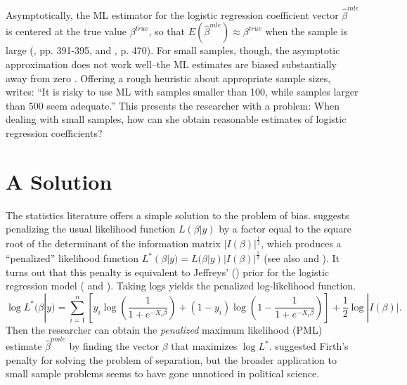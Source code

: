 \documentclass[12pt]{article}
\begin{document}
Asymptotically, the ML estimator for the logistic regression coefficient vector $\hat{\beta}^{mle}$ is centered at the true value $\beta^{true}$, so that $E(\hat{\beta}^{mle}) \approx \beta^{true}$ when the sample is large (\citealt{Wooldridge2002}, pp. 391-395, and \citealt{CasellaBerger2002}, p. 470).
For small samples, though, the asymptotic approximation does not work well--the ML estimates are biased substantially away from zero \citep[pp. 53-54]{Long1997}.
Offering a rough heuristic about appropriate sample sizes, \cite[p. 54]{Long1997} writes: ``It is risky to use ML with samples smaller than 100, while samples larger than 500 seem adequate.''
This presents the researcher with a problem: When dealing with small samples, how can she obtain reasonable estimates of logistic regression coefficients?

\section*{A Solution}

The statistics literature offers a simple solution to the problem of bias. 
\cite{Firth1993} suggests penalizing the usual likelihood function $L(\beta | y)$ by a factor equal to the square root of the determinant of the information matrix $|I(\beta)|^\frac{1}{2}$, which produces a ``penalized'' likelihood function $L^*(\beta | y) = L(\beta | y)|I(\beta)|^\frac{1}{2}$ (see also \citealt{KosmidisFirth2009} and \citealt{Kosmidis2014}). 
It turns out that this penalty is equivalent to Jeffreys' (\citeyear{Jeffreys1946}) prior for the logistic regression model (\citealt{Firth1993} and \citealt{Poirier1994}).
Taking logs yields the penalized log-likelihood function.
\begin{equation}\nonumber
\log L^*(\beta | y) = \displaystyle \sum_{i = 1}^n \left[y_i \log \left( \dfrac{1}{1 + e^{-X_i\beta}}\right) + (1 - y_i) \log \left(1 - \dfrac{1}{1 + e^{-X_i\beta}}\right)\right] + \dfrac{1}{2} \log |I(\beta)|.
\end{equation}
Then the researcher can obtain the \emph{penalized} maximum likelihood (PML) estimate $\hat{\beta}^{pmle}$ by finding the vector $\beta$ that maximizes $\log L^*$. 
\cite{Zorn2005} suggested Firth's penalty for solving the problem of separation,
but the broader application to small sample problems seems to have gone unnoticed in political science.
\end{document}
